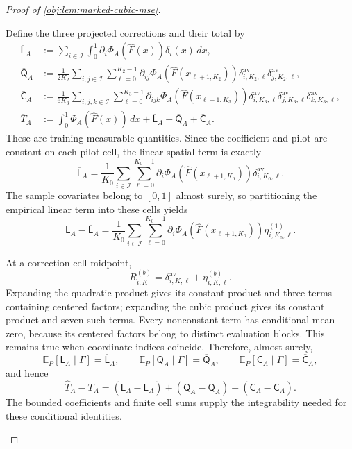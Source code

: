 \begin{proof}[Proof of \cref{obj:lem:marked-cubic-mse}]
\begin{enumerate}
Define the three projected corrections and their total by
\[
\begin{aligned}
\overline{\mathsf L}_A
&:=\sum_{i\in\mathcal I}\int_0^1
\partial_i\Phi_A(\widehat F(x))\delta_i(x)\,dx,\\
\overline{\mathsf Q}_A
&:=\frac1{2K_2}
\sum_{i,j\in\mathcal I}\sum_{\ell=0}^{K_2-1}
\partial_{ij}\Phi_A(\widehat F(x_{\ell+1,K_2}))
\delta^{\mathrm{av}}_{i,K_2,\ell}
\delta^{\mathrm{av}}_{j,K_2,\ell},\\
\overline{\mathsf C}_A
&:=\frac1{6K_3}
\sum_{i,j,k\in\mathcal I}\sum_{\ell=0}^{K_3-1}
\partial_{ijk}\Phi_A(\widehat F(x_{\ell+1,K_3}))
\delta^{\mathrm{av}}_{i,K_3,\ell}
\delta^{\mathrm{av}}_{j,K_3,\ell}
\delta^{\mathrm{av}}_{k,K_3,\ell},\\
\overline T_A
&:=\int_0^1\Phi_A(\widehat F(x))\,dx
+\overline{\mathsf L}_A+\overline{\mathsf Q}_A
+\overline{\mathsf C}_A.
\end{aligned}
\]
These are training-measurable quantities. Since the coefficient and pilot are constant on each pilot cell, the linear spatial term is exactly
\[
\overline{\mathsf L}_A
=
\frac1{K_0}\sum_{i\in\mathcal I}\sum_{\ell=0}^{K_0-1}
\partial_i\Phi_A(\widehat F(x_{\ell+1,K_0}))
\delta^{\mathrm{av}}_{i,K_0,\ell}.
\]
The sample covariates belong to \([0,1]\) almost surely, so partitioning the empirical linear term into these cells yields
\[
\mathsf L_A-\overline{\mathsf L}_A
=
\frac1{K_0}\sum_{i\in\mathcal I}\sum_{\ell=0}^{K_0-1}
\partial_i\Phi_A(\widehat F(x_{\ell+1,K_0}))
\eta^{(1)}_{i,K_0,\ell}.
\]

At a correction-cell midpoint,
\[
R^{(b)}_{i,K}
=\delta^{\mathrm{av}}_{i,K,\ell}
+\eta^{(b)}_{i,K,\ell}.
\]
Expanding the quadratic product gives its constant product and three terms containing centered factors; expanding the cubic product gives its constant product and seven such terms. Every nonconstant term has conditional mean zero, because its centered factors belong to distinct evaluation blocks. This remains true when coordinate indices coincide. Therefore, almost surely,
\[
\mathbb E_P[\mathsf L_A\mid\Gamma]=\overline{\mathsf L}_A,\qquad
\mathbb E_P[\mathsf Q_A\mid\Gamma]=\overline{\mathsf Q}_A,\qquad
\mathbb E_P[\mathsf C_A\mid\Gamma]=\overline{\mathsf C}_A,
\]
and hence
\[
\widehat T_A-\overline T_A
=
(\mathsf L_A-\overline{\mathsf L}_A)
+(\mathsf Q_A-\overline{\mathsf Q}_A)
+(\mathsf C_A-\overline{\mathsf C}_A).
\]
The bounded coefficients and finite cell sums supply the integrability needed for these conditional identities.


\end{enumerate}
\end{proof}

